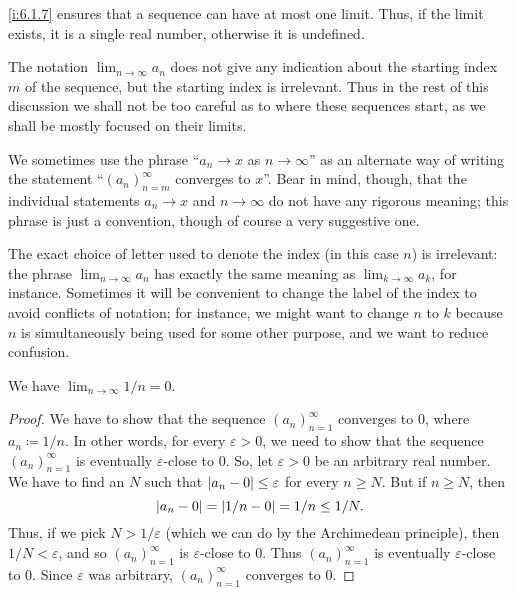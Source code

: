 \begin{note}
  \cref{i:6.1.7} ensures that a sequence can have at most one limit.
  Thus, if the limit exists, it is a single real number, otherwise it is undefined.
\end{note}

\begin{rmk}\label{i:6.1.9}
  The notation \(\lim_{n \to \infty} a_n\) does not give any indication about the starting index \(m\) of the sequence, but the starting index is irrelevant.
  Thus in the rest of this discussion we shall not be too careful as to where these sequences start, as we shall be mostly focused on their limits.
\end{rmk}

\begin{note}
  We sometimes use the phrase ``\(a_n \to x\) as \(n \to \infty\)'' as an alternate way of writing the statement ``\((a_n)_{n = m}^\infty\) converges to \(x\)''.
  Bear in mind, though, that the individual statements \(a_n \to x\) and \(n \to \infty\) do not have any rigorous meaning;
  this phrase is just a convention, though of course a very suggestive one.
\end{note}

\begin{rmk}\label{i:6.1.10}
  The exact choice of letter used to denote the index (in this case \(n\)) is irrelevant:
  the phrase \(\lim_{n \to \infty} a_n\) has exactly the same meaning as \(\lim_{k \to \infty} a_k\), for instance.
  Sometimes it will be convenient to change the label of the index to avoid conflicts of notation;
  for instance, we might want to change \(n\) to \(k\) because \(n\) is simultaneously being used for some other purpose, and we want to reduce confusion.
\end{rmk}

\begin{prop}\label{i:6.1.11}
  We have \(\lim_{n \to \infty} 1 / n = 0\).
\end{prop}

\begin{proof}
  We have to show that the sequence \((a_n)_{n = 1}^\infty\) converges to \(0\), where \(a_n \coloneqq 1 / n\).
  In other words, for every \(\varepsilon > 0\), we need to show that the sequence \((a_n)_{n = 1}^\infty\) is eventually \(\varepsilon\)-close to \(0\).
  So, let \(\varepsilon > 0\) be an arbitrary real number.
  We have to find an \(N\) such that \(\left\lvert a_n - 0\right\rvert \leq \varepsilon\) for every \(n \geq N\).
  But if \(n \geq N\), then
  \[
    \left\lvert a_n - 0\right\rvert = \left\lvert1 / n - 0\right\rvert = 1 / n \leq 1 / N.
  \]
  Thus, if we pick \(N > 1 / \varepsilon\) (which we can do by the Archimedean principle), then \(1 / N < \varepsilon\), and so \((a_n)_{n = 1}^\infty\) is \(\varepsilon\)-close to \(0\).
  Thus \((a_n)_{n = 1}^\infty\) is eventually \(\varepsilon\)-close to \(0\).
  Since \(\varepsilon\) was arbitrary, \((a_n)_{n = 1}^\infty\) converges to \(0\).
\end{proof}

